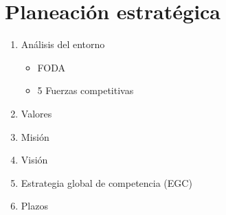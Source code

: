\section{Planeación estratégica}
\begin{enumerate}
    \item Análisis del entorno 
        \begin{itemize}
            \item FODA
            \item 5 Fuerzas competitivas 
        \end{itemize}
    
    \item Valores
    \item Misión 
    \item Visión 
    \item Estrategia global de competencia (EGC) 
    \item Plazos
\end{enumerate}


